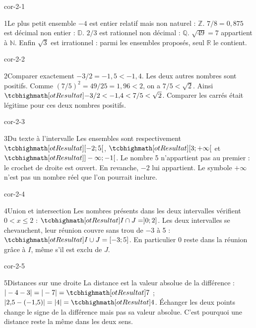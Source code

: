\clearpage\pagestyle{otMain}\fontsize{11}{15}\selectfont
{}
\begin{blocLivre}{cor-2-1}
\begin{corrige}{1}{Le plus petit ensemble}
$-4$ est entier relatif mais non naturel : $\mathbb Z$. $7/8=0{,}875$ est décimal non entier : $\mathbb D$. $2/3$ est rationnel non décimal : $\mathbb Q$. $\sqrt{49}=7$ appartient à $\mathbb N$. Enfin $\sqrt3$ est irrationnel : parmi les ensembles proposés, seul $\mathbb R$ le contient.
\end{corrige}
\end{blocLivre}
\begin{blocLivre}{cor-2-2}
\begin{corrige}{2}{Comparer exactement}
$-3/2=-1{,}5<-1{,}4$. Les deux autres nombres sont positifs. Comme $(7/5)^2=49/25=1{,}96<2$, on a $7/5<\sqrt2$. Ainsi $\res{-3/2<-1{,}4<7/5<\sqrt2}$. Comparer les carrés était légitime pour ces deux nombres positifs.
\end{corrige}
\end{blocLivre}
\begin{blocLivre}{cor-2-3}
\begin{corrige}{3}{Du texte à l’intervalle}
Les ensembles sont respectivement $\res{[-2;5[}$, $\res{[3;+\infty[}$ et $\res{]-\infty;-1[}$. Le nombre 5 n’appartient pas au premier : le crochet de droite est ouvert. En revanche, $-2$ lui appartient. Le symbole $+\infty$ n’est pas un nombre réel que l’on pourrait inclure.
\end{corrige}
\end{blocLivre}
\begin{blocLivre}{cor-2-4}
\begin{corrige}{4}{Union et intersection}
Les nombres présents dans les deux intervalles vérifient $0<x\le2$ : $\res{I\cap J=]0;2]}$. Les deux intervalles se chevauchent, leur réunion couvre sans trou de $-3$ à 5 : $\res{I\cup J=[-3;5]}$. En particulier 0 reste dans la réunion grâce à $I$, même s’il est exclu de $J$.
\label{fig-cor-2-4}
\end{corrige}
\end{blocLivre}
\begin{blocLivre}{cor-2-5}
\begin{corrige}{5}{Distances sur une droite}
La distance est la valeur absolue de la différence : $|-4-3|=|-7|=\res7$ ; $|2{,}5-(-1{,}5)|=|4|=\res4$. Échanger les deux points change le signe de la différence mais pas sa valeur absolue. C’est pourquoi une distance reste la même dans les deux sens.
\end{corrige}
\end{blocLivre}
